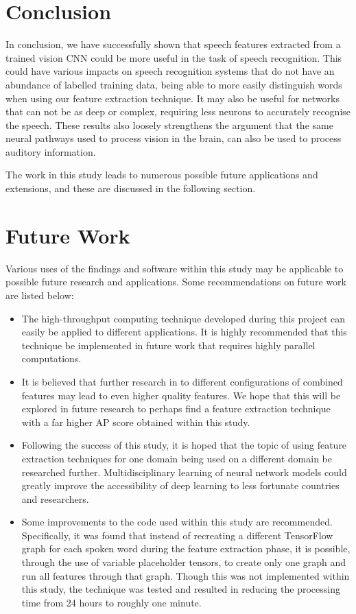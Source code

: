 \section{Conclusion}

In conclusion, we have successfully shown that speech features extracted from a trained vision CNN could be more useful in the task of speech recognition.
This could have various impacts on speech recognition systems that do not have an abundance of labelled training data, being able to more easily distinguish words when using our feature extraction technique.
It may also be useful for networks that can not be as deep or complex, requiring less neurons to accurately recognise the speech.
These results also loosely strengthens the argument that the same neural pathways used to process vision in the brain, can also be used to process auditory information.

The work in this study leads to numerous possible future applications and extensions, and these are discussed in the following section.

\section{Future Work}
\label{chap:future_work}

Various uses of the findings and software within this study may be applicable to possible future research and applications.
Some recommendations on future work are listed below:
\begin{itemize}
    \item The high-throughput computing technique developed during this project can easily be applied to different applications.
    It is highly recommended that this technique be implemented in future work that requires highly parallel computations.
    
    \item It is believed that further research in to different configurations of combined features may lead to even higher quality features.
    We hope that this will be explored in future research to perhaps find a feature extraction technique with a far higher AP score obtained within this study.
    
    \item Following the success of this study, it is hoped that the topic of using feature extraction techniques for one domain being used on a different domain be researched further.
    Multidisciplinary learning of neural network models could greatly improve the accessibility of deep learning to less fortunate countries and researchers.
    
    \item Some improvements to the code used within this study are recommended. 
    Specifically, it was found that instead of recreating a different TensorFlow graph for each spoken word during the feature extraction phase, it is possible, through the use of variable placeholder tensors, to create only one graph and run all features through that graph.
    Though this was not implemented within this study, the technique was tested and resulted in reducing the processing time from 24 hours to roughly one minute.
\end{itemize}

\label{chap:conclusion}